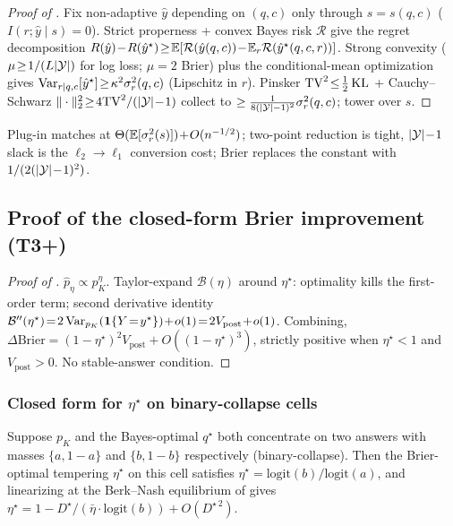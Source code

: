 \begin{proof}[Proof of ]
Fix non-adaptive $\hat y$ depending on $(q,c)$ only through
$s\!=\!s(q,c)$ ($I(r;\hat y\mid s)\!=\!0$).  Strict properness +
convex Bayes risk $\mathcal{R}$ give the regret decomposition
$R(\hat y)\!-\!R(\hat y^\star)\!\ge\!\mathbb{E}[\mathcal{R}(\hat y(q,c))\!-\!\mathbb{E}_r\mathcal{R}(\hat y^\star(q,c,r))]$.
Strong convexity ($\mu\!\ge\!1/(L|\mathcal{Y}|)$ for log loss; $\mu\!=\!2$
Brier) plus the conditional-mean optimization gives
$\operatorname{Var}_{r\mid q,c}[\hat y^\star]\!\ge\!\kappa^2\sigma_r^2(q,c)$
(Lipschitz in $r$).  Pinsker
$\mathrm{TV}^2\!\le\!\tfrac12\operatorname{KL}$ + Cauchy--Schwarz
$\|\cdot\|_2^2\!\ge\!4\mathrm{TV}^2/(|\mathcal{Y}|\!-\!1)$ collect to
$\ge\tfrac{1}{8(|\mathcal{Y}|-1)^2}\sigma_r^2(q,c)$; tower over $s$.
\end{proof}

\begin{remark}
Plug-in matches at $\Theta(\mathbb{E}[\sigma_r^2(s)])\!+\!O(n^{-1/2})$;
two-point reduction is tight, $|\mathcal{Y}|\!-\!1$ slack is the
$\ell_2\!\to\!\ell_1$ conversion cost; Brier replaces the constant
with $1/(2(|\mathcal{Y}|\!-\!1)^2)$.
\end{remark}


\subsection{Proof of the closed-form Brier improvement (T3+)}
\label{app:thm3-intervention}

\begin{proof}[Proof of ]
$\hat p_\eta\!\propto\!p_K^\eta$.  Taylor-expand
$\mathcal{B}(\eta)$ around $\eta^\star$: optimality kills the
first-order term; second derivative identity
$\mathcal{B}''(\eta^\star)\!=\!2\Var_{p_K}(\bm{1}\{Y\!=\!y^\star\})\!+\!o(1)\!=\!2V_{\mathrm{post}}\!+\!o(1)$.
Combining,
$\Delta\mathrm{Brier}\!=\!(1\!-\!\eta^\star)^2 V_{\mathrm{post}}\!+\!O((1\!-\!\eta^\star)^3)$,
strictly positive when $\eta^\star\!<\!1$ and
$V_{\mathrm{post}}\!>\!0$.  No stable-answer condition.
\end{proof}

\subsubsection{Closed form for $\eta^\star$ on binary-collapse cells}
\label{app:eta-closed-form}

\begin{lemma}
\label{lem:eta-closed-form-binary}
Suppose $p_K$ and the Bayes-optimal $q^\star$ both concentrate on
two answers with masses $\{a,1\!-\!a\}$ and $\{b,1\!-\!b\}$
respectively (binary-collapse).  Then the Brier-optimal tempering
$\eta^\star$ on this cell satisfies
$\eta^\star\!=\!\mathrm{logit}(b)/\mathrm{logit}(a)$, and
linearizing at the Berk--Nash equilibrium of
 gives
$\eta^\star\!=\!1\!-\!D^\star/(\bar\eta\cdot\mathrm{logit}(b))\!+\!O(D^{\star\,2})$.
\end{lemma}

